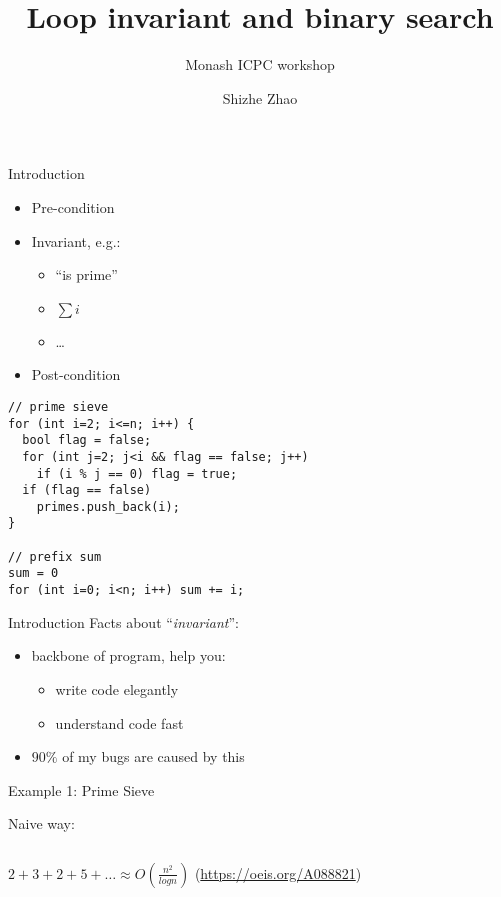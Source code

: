 \documentclass{beamer}
\title[Loop Invariant and Binary Search]{
  Loop invariant and binary search
}
\subtitle {Monash ICPC workshop}
\date{}
\author[Shizhe Zhao]{
  Shizhe Zhao
}
\begin{document}

\frame{\titlepage}

\begin{frame}[fragile]{Introduction}
  \begin{minipage}{.37\textwidth}
    \begin{itemize} 
      \item Pre-condition
      \item Invariant, e.g.:
        \vspace{2mm}
        \begin{itemize}
          \item ``is prime''
          \item $\sum i$
          \item \ldots
        \end{itemize}
      \item Post-condition 
    \end{itemize}
  \end{minipage}%
  \begin{minipage}{.63\textwidth}
   \begin{verbatim}
// prime sieve
for (int i=2; i<=n; i++) {
  bool flag = false;
  for (int j=2; j<i && flag == false; j++) 
    if (i % j == 0) flag = true;
  if (flag == false)
    primes.push_back(i);
}

// prefix sum
sum = 0
for (int i=0; i<n; i++) sum += i;
   \end{verbatim} 
  \end{minipage}
\end{frame}

\begin{frame}{Introduction}
Facts about ``\emph{invariant}'':
\begin{itemize}
  \item backbone of program, help you:
  \begin{itemize}
    \item write code elegantly
    \item understand code fast
  \end{itemize}
  \item $90\%$ of my bugs are caused by this
\end{itemize}
\end{frame}

\begin{frame}{Example 1: Prime Sieve}
 {
  \small Naive way:
  \inputminted[linenos=true, frame=lines, fontsize=\footnotesize]{python}{./src/prime0.py}
}
 {
  \small $2+3+2+5+\ldots \approx O(\frac{n^2}{log n})$ (\url{https://oeis.org/A088821})
}
\end{frame}
\end{document}
